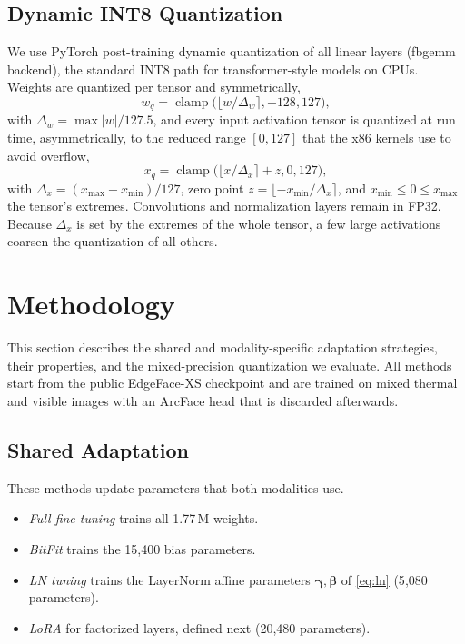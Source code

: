 \documentclass[journal]{IEEEtran}
\newcommand{\vect}[1]{\bm{#1}}
\begin{document}
\subsection{Dynamic INT8 Quantization}
We use PyTorch post-training dynamic quantization of all linear layers (fbgemm backend), the standard INT8 path for transformer-style models on CPUs. Weights are quantized per tensor and symmetrically,
\begin{equation}
  w_q = \operatorname{clamp}\!\big(\lfloor w/\Delta_w \rceil, -128, 127\big),
  \label{eq:wq}
\end{equation}
with $\Delta_w = \max|w|/127.5$, and every input activation tensor is quantized at run time, asymmetrically, to the reduced range $[0,127]$ that the x86 kernels use to avoid overflow,
\begin{equation}
  x_q = \operatorname{clamp}\!\big(\lfloor x/\Delta_x \rceil + z, 0, 127\big),
  \label{eq:xq}
\end{equation}
with $\Delta_x = (x_{\max}-x_{\min})/127$, zero point $z=\lfloor -x_{\min}/\Delta_x \rceil$, and $x_{\min}\le0\le x_{\max}$ the tensor's extremes. Convolutions and normalization layers remain in FP32. Because $\Delta_x$ is set by the extremes of the whole tensor, a few large activations coarsen the quantization of all others.

\section{Methodology}
\label{sec:method}
This section describes the shared and modality-specific adaptation strategies, their properties, and the mixed-precision quantization we evaluate. All methods start from the public EdgeFace-XS checkpoint and are trained on mixed thermal and visible images with an ArcFace head that is discarded afterwards.

\subsection{Shared Adaptation}
These methods update parameters that both modalities use.
\begin{itemize}
  \item \emph{Full fine-tuning} trains all 1.77\,M weights.
  \item \emph{BitFit} \cite{benzaken2022bitfit} trains the 15{,}400 bias parameters.
  \item \emph{LN tuning} trains the LayerNorm affine parameters $\vect{\gamma},\vect{\beta}$ of \eqref{eq:ln} (5{,}080 parameters).
  \item \emph{LoRA} \cite{hu2022lora} for factorized layers, defined next (20{,}480 parameters).
\end{itemize}
\end{document}
